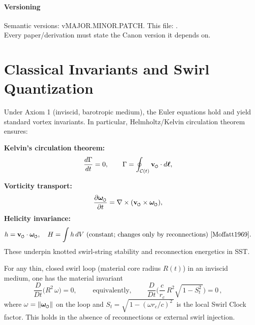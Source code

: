 \documentclass[11pt]{article}
\begin{document}
\vfill
\paragraph{Versioning} Semantic versions: vMAJOR.MINOR.PATCH. This file: \canonversion.\\
    Every paper/derivation must state the Canon version it depends on.
    \titlepageClose

\section{Classical Invariants and Swirl Quantization}
\label{sec:classical_invariants}
Under Axiom 1 (inviscid, barotropic medium), the Euler equations hold and yield standard vortex invariants. In particular, Helmholtz/Kelvin circulation theorem ensures:

\textbf{Kelvin's circulation theorem:}
\begin{equation}
    \frac{d\Gamma}{dt}=0, \qquad \Gamma=\oint_{\mathcal{C}(t)} \vswirl\cdot d\boldsymbol{\ell}, \label{eq:kelvin}
\end{equation}

\textbf{Vorticity transport:}
\begin{equation}
    \pdv{\omegas}{t} = \nabla\times(\vswirl\times \omegas), \label{eq:vorticity-transport}
\end{equation}
\textbf{Helicity invariance:}
\begin{equation} h=\vswirl\cdot \omegas,\quad H=\int h\, dV\ \text{(constant; changes only by reconnections)~\cite{Moffatt1969}}. \label{eq:helicity}
\end{equation}
These underpin knotted swirl-string stability and reconnection energetics in SST.

\begin{axiom}
\label{ax:chronos-kelvin}
For any thin, closed swirl loop (material core radius $R(t)$) in an inviscid medium, one has the material invariant
\begin{equation}
\boxed{\;
\frac{D}{Dt}\!\Big(R^2\,\omega\Big)=0,
    \;} \qquad \text{equivalently,} \qquad
\boxed{\;
\frac{D}{Dt}\!\Big(
\frac{c}{r_c}\,R^2 \sqrt{\,1-S_t^2\,}
\Big)=0\,,
    \;}
\label{eq:CK}
\end{equation}
where $\omega=\|\omegas\|$ on the loop and $S_t=\sqrt{\,1-(\omega r_c/c)^2\,}$ is the local Swirl Clock factor. This holds in the absence of reconnections or external swirl injection.
\end{axiom}
\end{document}
